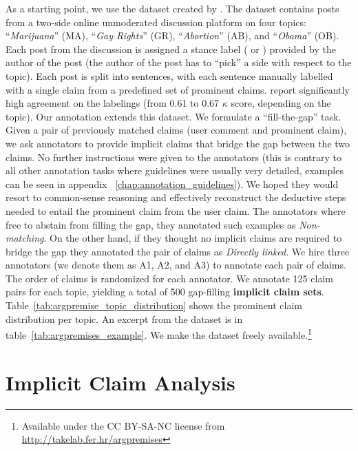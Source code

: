 As a starting point, we use the dataset created by
\citet{hasan2014you}. 
The dataset contains posts from a two-side online unmoderated discussion platform 
on four topics: ``\emph{Marijuana}'' (MA), ``\emph{Gay Rights}'' (GR), 
``\emph{Abortion}'' (AB), and ``\emph{Obama}'' (OB).
Each post from the discussion is assigned a stance label ( or ) 
provided by the author of the post (the author of the post has to ``pick'' a side 
with respect to the topic). 
Each post is split into sentences, with each sentence manually
labelled with a single claim from a predefined set of prominent
claims. 
\citet{hasan2014you} report significantly high agreement on the labelings
(from 0.61 to 0.67 $\kappa$ score, depending on the topic). 
Our annotation extends this dataset. 
We formulate a ``fill-the-gap'' task. 
Given a pair of previously matched claims (user comment and 
prominent claim), we ask annotators to provide implicit claims that bridge the gap 
between the two claims. 
No further instructions were given to the annotators (this is contrary to all other
annotation tasks where guidelines were usually very detailed, examples can be seen in appendix
~\ref{chap:annotation_guidelines}). 
We hoped they would resort to common-sense reasoning and effectively 
reconstruct the deductive steps needed to entail the prominent claim from the user
claim.
The annotators where free to abstain from filling the gap, they
annotated such examples as \emph{Non-matching}. 
On the other hand, if they thought no implicit claims are required
to bridge the gap they annotated the pair of claims as \emph{Directly linked}. 
We hire three annotators (we denote them as A1, A2, and A3) to annotate each pair of claims. 
The order of claims is randomized for each annotator. 
We annotate 125 claim pairs for each topic, yielding a total of 500 gap-filling
\textbf{implicit claim sets}. 
Table~\ref{tab:argpremise_topic_distribution} shows the prominent claim distribution per topic. 
An excerpt from the dataset is in table~\ref{tab:argpremises_example}. 
We make the dataset freely available.\footnote{Available under the CC BY-SA-NC license from
\url{http://takelab.fer.hr/argpremises}}

\section{Implicit Claim Analysis}
\label{sec:argpremise_analysis}

